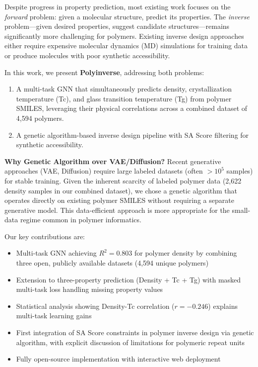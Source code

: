 \documentclass{article}
\begin{document}
Despite progress in property prediction, most existing work focuses on the
\textit{forward} problem: given a molecular structure, predict its properties.
The \textit{inverse} problem---given desired properties, suggest candidate
structures---remains significantly more challenging for polymers.
Existing inverse design approaches either require expensive molecular dynamics
(MD) simulations for training data \citep{vitrimer_inverse_2023} or produce
molecules with poor synthetic accessibility.

In this work, we present \textbf{Polyinverse}, addressing both problems:
\begin{enumerate}
    \item A multi-task GNN that simultaneously predicts density, crystallization
    temperature (Tc), and glass transition temperature (Tg) from polymer SMILES,
    leveraging their physical correlations across a combined dataset of 4,594 polymers.
    \item A genetic algorithm-based inverse design pipeline with SA Score
    \citep{ertl_sa_score_2009} filtering for synthetic accessibility.
\end{enumerate}

\noindent\textbf{Why Genetic Algorithm over VAE/Diffusion?}
Recent generative approaches (VAE, Diffusion) require large labeled datasets
(often $>10^5$ samples) for stable training. Given the inherent scarcity of
labeled polymer data (2,622 density samples in our combined dataset), we chose a
genetic algorithm that operates directly on existing polymer SMILES without
requiring a separate generative model. This data-efficient approach is more
appropriate for the small-data regime common in polymer informatics.

\noindent Our key contributions are:
\begin{itemize}
    \item Multi-task GNN achieving $R^2=0.803$ for polymer density by combining
    three open, publicly available datasets (4,594 unique polymers)
    \item Extension to three-property prediction (Density + Tc + Tg) with
    masked multi-task loss handling missing property values
    \item Statistical analysis showing Density-Tc correlation ($r=-0.246$)
    explains multi-task learning gains
    \item First integration of SA Score constraints in polymer inverse design
    via genetic algorithm, with explicit discussion of limitations for
    polymeric repeat units
    \item Fully open-source implementation with interactive web deployment
\end{itemize}
\end{document}
